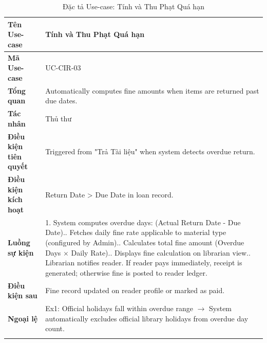 \begin{longtable}{|p{3.5cm}|p{11.5cm}|}
    \hline
    \textbf{Tên Use-case} & \textbf{Tính và Thu Phạt Quá hạn} \\
    \hline
    \textbf{Mã Use-case} & UC-CIR-03 \\
    \hline
    \textbf{Tổng quan} & Automatically computes fine amounts when items are returned past due dates. \\
    \hline
    \textbf{Tác nhân} & Thủ thư \\
    \hline
    \textbf{Điều kiện tiên quyết} & Triggered from "Trả Tài liệu" when system detects overdue return. \\
    \hline
    \textbf{Điều kiện kích hoạt} & Return Date > Due Date in loan record. \\
    \hline
    \textbf{Luồng sự kiện} & 
    1. System computes overdue days: (Actual Return Date - Due Date).\newline
    2. Fetches daily fine rate applicable to material type (configured by Admin).\newline
    3. Calculates total fine amount (Overdue Days $\times$ Daily Rate).\newline
    4. Displays fine calculation on librarian view.\newline
    5. Librarian notifies reader. If reader pays immediately, receipt is generated; otherwise fine is posted to reader ledger. \\
    \hline
    \textbf{Điều kiện sau} & Fine record updated on reader profile or marked as paid. \\
    \hline
    \textbf{Ngoại lệ} & 
    Ex1: Official holidays fall within overdue range $\rightarrow$ System automatically excludes official library holidays from overdue day count. \\
    \hline
    \caption{Đặc tả Use-case: Tính và Thu Phạt Quá hạn}
\end{longtable}


